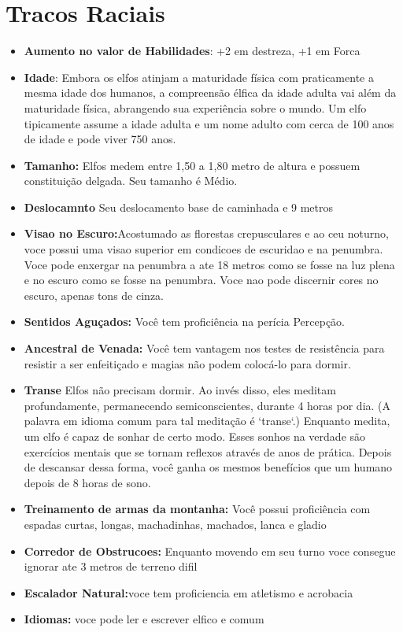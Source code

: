 \documentclass{book}
\begin{document}
\section{Tracos Raciais}
\begin{itemize}
    \item \textbf{Aumento no valor de Habilidades}: +2 em destreza, +1 em Forca
    \item \textbf{Idade}: Embora os elfos atinjam a maturidade física com praticamente a mesma 
          idade dos humanos, a compreensão élfica da idade adulta vai além da maturidade 
          física, abrangendo sua experiência sobre o mundo. Um elfo tipicamente assume 
          a idade adulta e um nome adulto com cerca de 100 anos de idade e pode viver
          750 anos.
    \item \textbf{Tamanho:} Elfos medem entre 1,50 a 1,80 metro de altura e possuem 
          constituição delgada. Seu tamanho é Médio.
    \item \textbf{Deslocamnto} Seu deslocamento base de caminhada e 9 metros
    \item \textbf{Visao no Escuro:}Acostumado as florestas crepusculares e ao ceu noturno, voce
          possui uma visao superior em condicoes de escuridao e na penumbra. Voce pode 
          enxergar na penumbra a ate 18 metros como se fosse na luz plena e no escuro 
          como se fosse na penumbra. Voce nao pode discernir cores no escuro, apenas tons
          de cinza.
    \item \textbf{Sentidos Aguçados:} Você tem proficiência na perícia Percepção.
    \item \textbf{Ancestral de Venada:} Você tem vantagem nos testes de resistência para 
          resistir  a ser enfeitiçado e magias não podem colocá-lo para dormir.
    \item \textbf{Transe} Elfos não precisam dormir. Ao invés disso, eles meditam 
          profundamente, permanecendo semiconscientes, durante 4 horas por 
          dia. (A palavra em idioma comum para tal meditação é `transe`.) Enquanto
          medita, um elfo é capaz de sonhar de certo modo. Esses sonhos na verdade 
          são exercícios mentais que se tornam reflexos através de anos de prática.
          Depois de descansar dessa forma, você ganha os mesmos benefícios que um
          humano depois de 8 horas de sono.
    \item \textbf{Treinamento de armas da montanha:} Você possui proficiência com espadas 
          curtas, longas, machadinhas, machados, lanca e gladio
    \item \textbf{Corredor de Obstrucoes:} Enquanto movendo em seu turno voce consegue ignorar 
          ate 3 metros de terreno difil

    \item \textbf{Escalador Natural:}voce tem proficiencia em atletismo e acrobacia
    \item \textbf{Idiomas:} voce pode ler e escrever elfico e comum 
\end{itemize}
\end{document}

